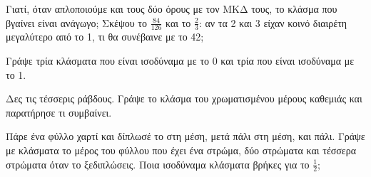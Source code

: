 \ex Γιατί, όταν απλοποιούμε και τους δύο όρους με τον ΜΚΔ τους, το κλάσμα που βγαίνει είναι ανάγωγο; Σκέψου το $\frac{84}{126}$ και το $\frac{2}{3}$: αν τα 2 και 3 είχαν κοινό διαιρέτη μεγαλύτερο από το 1, τι θα συνέβαινε με το 42;

\ex Γράψε τρία κλάσματα που είναι ισοδύναμα με το 0 και τρία που είναι ισοδύναμα με το 1.


\ex Δες τις τέσσερις ράβδους. Γράψε το κλάσμα του χρωματισμένου μέρους καθεμιάς και παρατήρησε τι συμβαίνει.\par\smallskip
{}\quad{}\quad{}\quad{}

\ex Πάρε ένα φύλλο χαρτί και δίπλωσέ το στη μέση, μετά πάλι στη μέση, και πάλι. Γράψε με κλάσματα το μέρος του φύλλου που έχει ένα στρώμα, δύο στρώματα και τέσσερα στρώματα όταν το ξεδιπλώσεις. Ποια ισοδύναμα κλάσματα βρήκες για το $\frac{1}{2}$;
